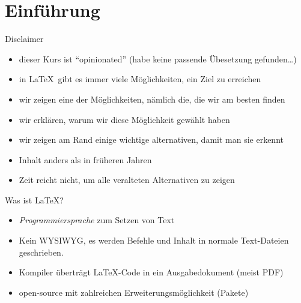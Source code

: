 \section{Einführung}

\begin{frame}{Disclaimer}
  \begin{itemize}
    \item dieser Kurs ist \enquote{opinionated} (habe keine passende Übesetzung gefunden…)
    \item in \LaTeX\ gibt es immer viele Möglichkeiten, ein Ziel zu erreichen
    \item wir zeigen eine der Möglichkeiten, nämlich die, die wir am besten finden
    \item wir erklären, warum wir diese Möglichkeit gewählt haben
    \item wir zeigen am Rand einige wichtige alternativen, damit man sie erkennt
  \end{itemize}

  \vspace{10pt}
  \begin{itemize}
    \item Inhalt anders als in früheren Jahren
    \item Zeit reicht nicht, um alle veralteten Alternativen zu zeigen
  \end{itemize}
\end{frame}

\begin{frame}{Was ist \LaTeX?}
  \begin{itemize}
    \item \emph{Programmiersprache} zum Setzen von Text
    \item Kein WYSIWYG, es werden Befehle und Inhalt in normale Text-Dateien geschrieben.
    \item Kompiler überträgt \LaTeX-Code in ein Ausgabedokument (meist PDF)
    \item open-source mit zahlreichen Erweiterungsmöglichkeit (Pakete)
  \end{itemize}
\end{frame}

